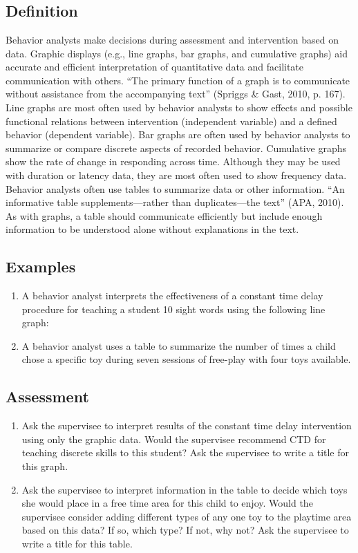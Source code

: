 \clearpage \section[\fourjFifteen{}]{\fourjFifteen{}%
              }
\subsection{Definition}
Behavior analysts make decisions during assessment and intervention based on data. Graphic displays (e.g., line graphs, bar graphs, and cumulative graphs) aid accurate and efficient interpretation of quantitative data and facilitate communication with others. ``The primary function of a graph is to communicate without assistance from the accompanying text'' (Spriggs \& Gast, 2010, p. 167). Line graphs are most often used by behavior analysts to show effects and possible functional relations between intervention (independent variable) and a defined behavior (dependent variable). Bar graphs are often used by behavior analysts to summarize or compare discrete aspects of recorded behavior. Cumulative graphs show the rate of change in responding across time. Although they may be used with duration or latency data, they are most often used to show frequency data. Behavior analysts often use tables to summarize data or other information. ``An informative table supplements—rather than duplicates—the text'' (APA, 2010). As with graphs, a table should communicate efficiently but include enough information to be understood alone without explanations in the text.
%
\subsection{Examples}
\begin{enumerate}
\item A behavior analyst interprets the effectiveness of a constant time delay procedure for teaching a student 10 sight words using the following line graph: 
\item A behavior analyst uses a table to summarize the number of times a child chose a specific toy during seven sessions of free-play with four toys available. 
\end{enumerate}
%
\subsection{Assessment}
\begin{enumerate}
\item Ask the supervisee to interpret results of the constant time delay intervention using only the graphic data. Would the supervisee recommend CTD for teaching discrete skills to this student? Ask the supervisee to write a title for this graph.
\item Ask the supervisee to interpret information in the table to decide which toys she would place in a free time area for this child to enjoy. Would the supervisee consider adding different types of any one toy to the playtime area based on this data? If so, which type? If not, why not? Ask the supervisee to write a title for this table.
%
\end{enumerate}
%
